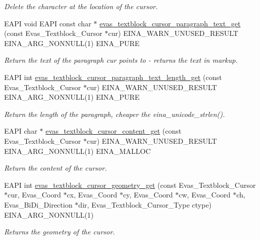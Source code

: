 \begin{DoxyCompactItemize}
\begin{DoxyCompactList}\small\item\em Delete the character at the location of the cursor. \item\end{DoxyCompactList}\item 
EAPI void EAPI const char $\ast$ \hyperlink{group__Evas__Object__Textblock_ga2369c2b14e0a58379e28327870a57f23}{evas\_\-textblock\_\-cursor\_\-paragraph\_\-text\_\-get} (const Evas\_\-Textblock\_\-Cursor $\ast$cur) EINA\_\-WARN\_\-UNUSED\_\-RESULT EINA\_\-ARG\_\-NONNULL(1) EINA\_\-PURE
\begin{DoxyCompactList}\small\item\em Return the text of the paragraph cur points to -\/ returns the text in markup. \item\end{DoxyCompactList}\item 
EAPI int \hyperlink{group__Evas__Object__Textblock_ga57b2e7d853306c435946e0db83080db5}{evas\_\-textblock\_\-cursor\_\-paragraph\_\-text\_\-length\_\-get} (const Evas\_\-Textblock\_\-Cursor $\ast$cur) EINA\_\-WARN\_\-UNUSED\_\-RESULT EINA\_\-ARG\_\-NONNULL(1) EINA\_\-PURE
\begin{DoxyCompactList}\small\item\em Return the length of the paragraph, cheaper the eina\_\-unicode\_\-strlen(). \item\end{DoxyCompactList}\item 
EAPI char $\ast$ \hyperlink{group__Evas__Object__Textblock_ga77a5f2b742f74110aad4f0b2af6a91aa}{evas\_\-textblock\_\-cursor\_\-content\_\-get} (const Evas\_\-Textblock\_\-Cursor $\ast$cur) EINA\_\-WARN\_\-UNUSED\_\-RESULT EINA\_\-ARG\_\-NONNULL(1) EINA\_\-MALLOC
\begin{DoxyCompactList}\small\item\em Return the content of the cursor. \item\end{DoxyCompactList}\item 
EAPI int \hyperlink{group__Evas__Object__Textblock_ga53de4d5aa108014959e6eef6cc09e463}{evas\_\-textblock\_\-cursor\_\-geometry\_\-get} (const Evas\_\-Textblock\_\-Cursor $\ast$cur, Evas\_\-Coord $\ast$cx, Evas\_\-Coord $\ast$cy, Evas\_\-Coord $\ast$cw, Evas\_\-Coord $\ast$ch, Evas\_\-BiDi\_\-Direction $\ast$dir, Evas\_\-Textblock\_\-Cursor\_\-Type ctype) EINA\_\-ARG\_\-NONNULL(1)
\begin{DoxyCompactList}\small\item\em Returns the geometry of the cursor. \item\end{DoxyCompactList}\item 

\end{DoxyCompactItemize}
